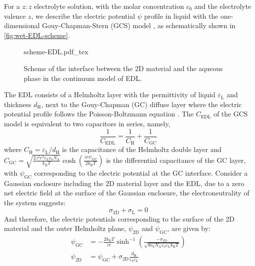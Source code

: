 For a \(z:z\) electrolyte solution, with the molar concentration
\(c_{0}\) and the electrolyte valence \(z\), we describe the electric
potential $\psi$ profile in liquid with the one-dimensional
Gouy-Chapman-Stern (GCS) model \autocite{Stern_1924_theory}, as schematically
shown in \autoref{fig:wet-EDL-scheme}.
%
\begin{figure}[!htbp]
  \centering
  {scheme-EDL.pdf_tex}
  \caption{\label{fig:wet-EDL-scheme} Scheme of the interface between
    the 2D material and the aqueous phase in the continuum model of
    EDL.}
\end{figure}
The EDL consists of a
Helmholtz layer with the permittivity of liquid
\(\varepsilon_{\mathrm{L}}\) and thickness \(d_{\mathrm{H}}\), next to
the Gouy-Chapman (GC) diffuse layer where the electric potential
profile follows the Poisson-Boltzmann equation
\autocite{Bard_1980_electrochem_book}.
%
The \(C_{\mathrm{EDL}}\) of the
GCS model is equivalent to two capacitors in series,
namely,
\begin{equation}
\label{eqn:wet-GCS-capacitance-series}
\frac{1}{C_{\mathrm{EDL}}} = \frac{1}{C_{\mathrm{H}}} + \frac{1}{C_{\mathrm{GC}}}
\end{equation}
where \(C_{\mathrm{H}}=\varepsilon_{\mathrm{L}}/d_{\mathrm{H}}\) is the
capacitance of the Helmholtz double layer and
\(C_{\mathrm{GC}}=\sqrt{\frac{2z^{2}e^{2}\varepsilon_{\mathrm{L}}c_{0}N_{\mathrm{A}}}{k_{\mathrm{B}}T}}
\cosh(\frac{ze\psi_{\mathrm{GC}}}{2k_{\mathrm{B}}T})\) is the
differential capacitance of the GC layer, with \(\psi_{\mathrm{GC}}\)
corresponding to the electric potential at the GC interface.
%
Consider
a Gaussian enclosure including the 2D material layer and the EDL, due
to a zero net electric field at the surface of the Gaussian enclosure,
the electroneutrality of the system \autocite{Bard_1980_electrochem_book}
suggests:
\begin{equation}
\label{eqn:wet-neutrality}
\sigma_{\mathrm{2D}} + \sigma_{\mathrm{L}} = 0
\end{equation}
And therefore, the electric potentials corresponding to the surface of
the 2D material and the outer Helmholtz plane, \(\psi_{\mathrm{2D}}\)
and \(\psi_{\mathrm{GC}}\), are given by:
\begin{equation}
\label{eqn:wet-psi-GC}
\begin{aligned}
  \psi_{\mathrm{GC}} &= -\frac{2k_{\mathrm{B}}T}{ze} 
                         \sinh^{-1}\left(
                         \frac{-\sigma_{\mathrm{2D}}}{\sqrt{8c_{0}N_{\mathrm{A}}\varepsilon_{0}\varepsilon_{\mathrm{L}}k_{\mathrm{B}}T}}
                            \right) \\
  \psi_{\mathrm{2D}} &= \psi_{\mathrm{GC}} + \sigma_{\mathrm{2D}}\frac{d_{\mathrm{H}}}{\varepsilon_{0}\varepsilon_{\mathrm{L}}}
\end{aligned}
\end{equation}
